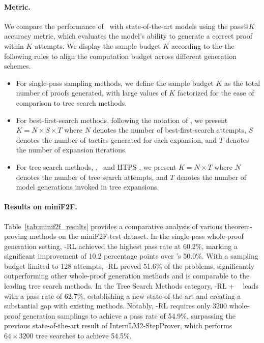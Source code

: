\paragraph{Metric.}
We compare the performance of \thiswork~with state-of-the-art models using the pass@$K$ accuracy metric, which evaluates the model's ability to generate a correct proof within $K$ attempts.
We display the sample budget $K$ according to the the following rules to align the computation budget across different generation schemes.
\begin{itemize}
    \item For single-pass sampling methods, we define the sample budget $K$ as the total number of proofs generated, with large values of $K$ factorized for the ease of comparison to tree search methods.
    \item For best-first-search methods, following the notation of \citet{azerbayev2024llemma}, we present $K=N\times S\times T$ where $N$ denotes the number of best-first-search attempts, $S$ denotes the number of tactics generated for each expansion, and $T$ denotes the number of expansion iterations.
    \item For tree search methods, \eg, \treesearch~and HTPS \citep{lample2022hypertree}, we present $K=N\times T$ where $N$ denotes the number of tree search attempts, and $T$ denotes the number of model generations invoked in tree expansions.
\end{itemize}


\paragraph{Results on miniF2F.}
Table~\ref{tab:minif2f_results} provides a comparative analysis of various theorem-proving methods on the miniF2F-test dataset. In the single-pass whole-proof generation setting, \thiswork-RL achieved the highest pass rate at 60.2\%, marking a significant improvement of 10.2 percentage points over \lastwork's 50.0\%. With a sampling budget limited to 128 attempts, \thiswork-RL proved 51.6\% of the problems, significantly outperforming other whole-proof generation methods and is comparable to the leading tree search methods. In the Tree Search Methods category, \thiswork-RL + \treesearch~ leads with a pass rate of 62.7\%, establishing a new state-of-the-art and creating a substantial gap with existing methods. Notably, \thiswork-RL requires only 3200 whole-proof generation samplings to achieve a pass rate of 54.9\%, surpassing the previous state-of-the-art result of InternLM2-StepProver, which performs $64\times 3200$ tree searches to achieve 54.5\%.


